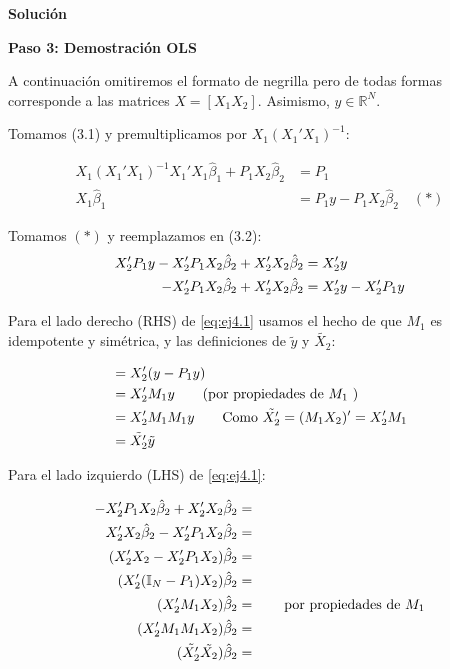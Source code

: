 \documentclass[a4paper, answers, addpoints, 11pt]{exam}
\newenvironment{solucion}{%
  \begin{mdframed}[
    backgroundcolor=blue!5,    %
    linecolor=blue!50,          %
    linewidth=2pt,              %
    leftmargin=10pt,            %
    rightmargin=8pt,           %
    topline=true,              %
    bottomline=true,            %
    roundcorner=10pt,           %
    innerleftmargin=10pt,       %
    innerrightmargin=10pt,      %
    innerbottommargin=10pt,     %
    innertopmargin=10pt         %
  ]%
  \begin{tcolorbox}[colframe=blue!50!black, colback=blue!50, coltitle=white, sharp corners=all, boxrule=1mm, width=\textwidth, halign=left, valign=center, top=0mm, bottom=0mm, left=0mm, right=0mm] \textbf{Solución} \end{tcolorbox} }{\end{mdframed}}
\begin{document}
\begin{enumerate}
\begin{solucion}
\textbf{Paso 3: Demostración OLS}


A continuación omitiremos el formato de negrilla pero de todas formas corresponde a las matrices $X=[X_1 X_2]$. Asimismo, $y\in \mathbb{R}^N$.

Tomamos (3.1) y premultiplicamos por $X_1 (X_1'X_1)^{-1}$:

\begin{align*} 
X_1 (X_1'X_1)^{-1} X_1'X_1 \hat{\beta}_1 + P_{1} X_2 \hat{\beta}_2 &= P_{1} \\
X_1 \hat{\beta}_1 &= P_{1} y - P_{1} X_2 \hat{\beta}_2 \quad (*)
\end{align*}

Tomamos \((*)\) y reemplazamos en (3.2):
\begin{align}
X_2' P_{1} y - X_2' P_{1} X_2 \hat{\beta}_2 + X_2' X_2 \hat{\beta}_2 &= X_2'y \notag \\
- X_2' P_{1} X_2 \hat{\beta}_2 + X_2' X_2 \hat{\beta}_2 &= X_2'y - X_2' P_{1} y \label{eq:ej4.1}\\
\end{align}

Para el lado derecho (RHS) de \ref{eq:ej4.1} usamos el hecho de que $M_1$ es idempotente y simétrica, y las definiciones de $\tilde{y}$ y $\tilde{X_2}$:

\begin{align}
&= X_2'(y-P_1y) \notag \\
&= X_2'M_1y \qquad \text{(por propiedades de $M_1$ )} \notag \\
&= X_2'M_1 M_1 y \qquad \text{Como $\tilde{X_2'}= (M_1X_2)' = X_2'M_1$} \notag \\
&= \tilde{X_2'}\tilde{y} \label{eq:ej4.RHS}
\end{align}

Para el lado izquierdo (LHS) de \ref{eq:ej4.1}:


\begin{align}
- X_2' P_{1} X_2 \hat{\beta}_2 + X_2' X_2 \hat{\beta}_2 &= \notag  \\
X_2' X_2 \hat{\beta}_2 - X_2' P_{1} X_2 \hat{\beta}_2  &=  \notag \\
(X_2' X_2 - X_2' P_{1} X_2 ) \hat{\beta}_2  &=  \notag \\
(X_2'(\mathbb{I}_N - P_1) X_2 ) \hat{\beta}_2  &=  \notag \\
 (X_2'M_1X_2)\hat{\beta}_2&= \notag \qquad \text{por propiedades de $M_1$} \\
 (X_2'M_1M_1X_2)\hat{\beta}_2&= \notag \\
  (\tilde{X_2'}\tilde{X_2})\hat{\beta}_2&= \label{eq:ej4.LHS}
\end{align}


\end{solucion}
\end{enumerate}
\end{document}
